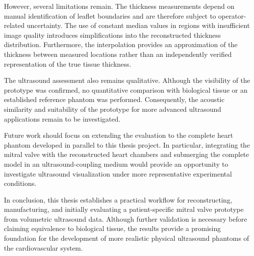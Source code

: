 However, several limitations remain. The thickness measurements depend on manual identification of leaflet boundaries and are therefore subject to operator-related uncertainty. The use of constant median values in regions with insufficient image quality introduces simplifications into the reconstructed thickness distribution. Furthermore, the interpolation provides an approximation of the thickness between measured locations rather than an independently verified representation of the true tissue thickness.

The ultrasound assessment also remains qualitative. Although the visibility of the prototype was confirmed, no quantitative comparison with biological tissue or an established reference phantom was performed. Consequently, the acoustic similarity and suitability of the prototype for more advanced ultrasound applications remain to be investigated.

Future work should focus on extending the evaluation to the complete heart phantom developed in parallel to this thesis project. In particular, integrating the mitral valve with the reconstructed heart chambers and submerging the complete model in an ultrasound-coupling medium would provide an opportunity to investigate ultrasound visualization under more representative experimental conditions.

In conclusion, this thesis establishes a practical workflow for reconstructing, manufacturing, and initially evaluating a patient-specific mitral valve prototype from volumetric ultrasound data. Although further validation is necessary before claiming equivalence to biological tissue, the results provide a promising foundation for the development of more realistic physical ultrasound phantoms of the cardiovascular system.